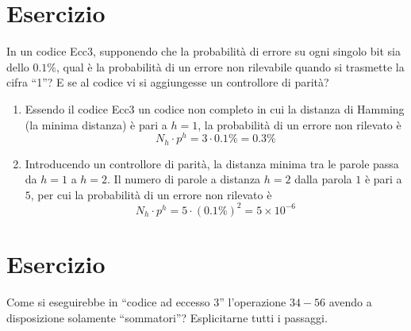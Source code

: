 \documentclass[a4paper]{extarticle}
\newcommand{\quotes}[1]{``#1''}
\begin{document}
\noindent
\section{Esercizio}
In un codice Ecc3, supponendo che la probabilità di errore su ogni singolo bit sia dello $0.1 \%$, qual è la probabilità di un errore non rilevabile quando si trasmette la cifra \quotes{1}? E se al codice vi si aggiungesse un controllore di parità?

\begin{enumerate}
    \item Essendo il codice Ecc3 un codice non completo in cui la distanza di Hamming (la minima distanza) è pari a $h=1$, la probabilità di un errore non rilevato è
    \[N_h \cdot p^h = 3 \cdot 0.1\% = 0.3\%\]

    \item Introducendo un controllore di parità, la distanza minima tra le parole passa da $h=1$ a $h=2$. Il numero di parole a distanza $h=2$ dalla parola $1$ è pari a $5$, per cui la probabilità di un errore non rilevato è
    \[N_h \cdot p^h = 5 \cdot (0.1\%)^2 = 5 \times 10^{-6}\]
\end{enumerate}

\noindent
\section{Esercizio}
Come si eseguirebbe in \quotes{codice ad eccesso $3$} l'operazione $34-56$ avendo a disposizione solamente \quotes{sommatori}? Esplicitarne tutti i passaggi.
\end{document}
